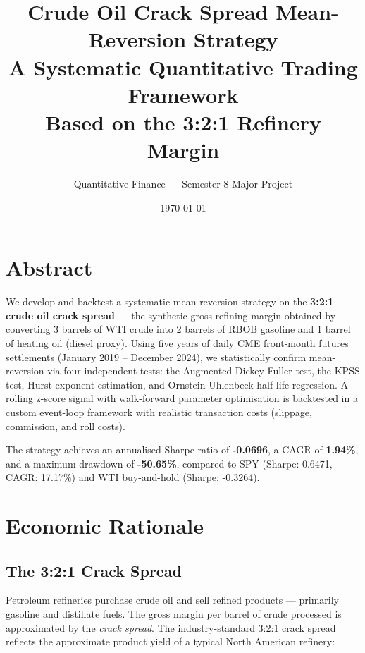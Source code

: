 \documentclass[12pt,a4paper]{article}
\title{
  \Large\textbf{Crude Oil Crack Spread Mean-Reversion Strategy}\\[0.4em]
  \large A Systematic Quantitative Trading Framework\\
  \large Based on the 3:2:1 Refinery Margin
}
\author{Quantitative Finance — Semester 8 Major Project}
\date{\today}
\begin{document}
\maketitle
\tableofcontents
\newpage

\section{Abstract}

We develop and backtest a systematic mean-reversion strategy on the
\textbf{3:2:1 crude oil crack spread} --- the synthetic gross refining
margin obtained by converting 3 barrels of WTI crude into 2 barrels
of RBOB gasoline and 1 barrel of heating oil (diesel proxy).
Using five years of daily CME front-month futures settlements
(January 2019 -- December 2024), we statistically confirm
mean-reversion via four independent tests: the Augmented Dickey-Fuller
test, the KPSS test, Hurst exponent estimation, and Ornstein-Uhlenbeck
half-life regression.
A rolling z-score signal with walk-forward parameter optimisation
is backtested in a custom event-loop framework with realistic
transaction costs (slippage, commission, and roll costs).

The strategy achieves an annualised Sharpe ratio of \textbf{-0.0696},
a CAGR of \textbf{1.94\%},
and a maximum drawdown of \textbf{-50.65\%},
compared to SPY (Sharpe: 0.6471, CAGR: 17.17\%)
and WTI buy-and-hold (Sharpe: -0.3264).


\section{Economic Rationale}

\subsection{The 3:2:1 Crack Spread}

Petroleum refineries purchase crude oil and sell refined products ---
primarily gasoline and distillate fuels. The gross margin per barrel
of crude processed is approximated by the \textit{crack spread}.
The industry-standard 3:2:1 crack spread reflects the approximate
product yield of a typical North American refinery:
\end{document}
